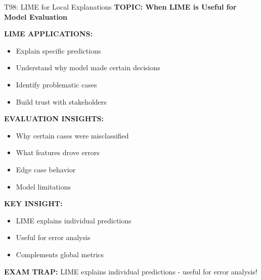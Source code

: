 \documentclass[8pt]{beamer}
\begin{document}
	\begin{frame}{T98: LIME for Local Explanations}
		\fontsize{6.5}{7.5}\selectfont
		\textbf{TOPIC: When LIME is Useful for Model Evaluation}
		
		\vspace{0.1cm}
		\textbf{LIME APPLICATIONS:}
		\begin{itemize}
			\item Explain specific predictions
			\item Understand why model made certain decisions
			\item Identify problematic cases
			\item Build trust with stakeholders
		\end{itemize}
		
		\vspace{0.1cm}
		\textbf{EVALUATION INSIGHTS:}
		\begin{itemize}
			\item Why certain cases were misclassified
			\item What features drove errors
			\item Edge case behavior
			\item Model limitations
		\end{itemize}
		
		\vspace{0.1cm}
		\textbf{KEY INSIGHT:}
		\begin{itemize}
			\item LIME explains individual predictions
			\item Useful for error analysis
			\item Complements global metrics
		\end{itemize}
		
		\textcolor{myred}{\textbf{EXAM TRAP:}} LIME explains \textcolor{myblue}{individual predictions} - useful for error analysis!
	\end{frame}
	
\end{document}
